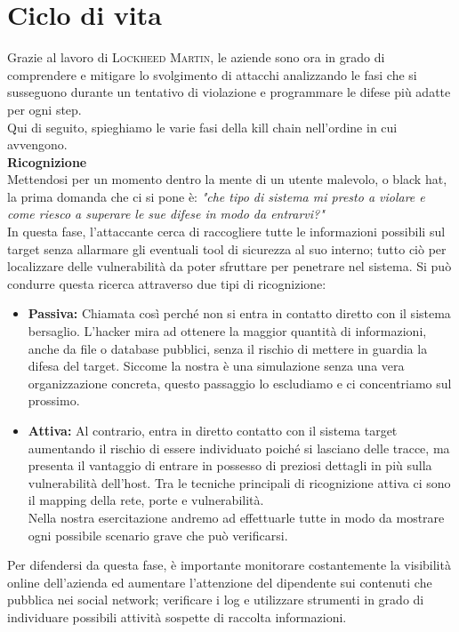 \section{Ciclo di vita}
Grazie al lavoro di \textsc{Lockheed Martin}, le aziende sono ora in grado di comprendere e mitigare lo svolgimento di attacchi analizzando le fasi che si susseguono durante un tentativo di violazione e programmare le difese più adatte per ogni step.\\
Qui di seguito, spieghiamo le varie fasi della kill chain nell'ordine in cui avvengono.\cite{kill_chain}\\[1.5em]
{\bfseries\Large{\textbf{Ricognizione}}}\\[1em]
Mettendosi per un momento dentro la mente di un utente malevolo, o black hat, la prima domanda che ci si pone è: \textit{"che tipo di sistema mi presto a violare e come riesco a superare le sue difese in modo da entrarvi?"}\\
In questa fase, l'attaccante cerca di raccogliere tutte le informazioni possibili sul target senza allarmare gli eventuali tool di sicurezza al suo interno; tutto ciò per localizzare delle vulnerabilità da poter sfruttare per penetrare nel sistema. Si può condurre questa ricerca attraverso due tipi di ricognizione:
\begin{itemize}
    \item \textbf{Passiva:} Chiamata così perché non si entra in contatto diretto con il sistema bersaglio. L'hacker mira ad ottenere la maggior quantità di informazioni, anche da file o database pubblici, senza il rischio di mettere in guardia la difesa del target. Siccome la nostra è una simulazione senza una vera organizzazione concreta, questo passaggio lo escludiamo e ci concentriamo sul prossimo.
    \item \textbf{Attiva:} Al contrario, entra in diretto contatto con il sistema target aumentando il rischio di essere individuato poiché si lasciano delle tracce, ma presenta il vantaggio di entrare in possesso di preziosi dettagli in più sulla vulnerabilità dell'host. Tra le tecniche principali di ricognizione attiva ci sono il mapping della rete, porte e vulnerabilità.\\Nella nostra esercitazione andremo ad effettuarle tutte in modo da mostrare ogni possibile scenario grave che può verificarsi.
\end{itemize}
Per difendersi da questa fase, è importante monitorare costantemente la visibilità online dell'azienda ed aumentare l'attenzione del dipendente sui contenuti che pubblica nei social network; verificare i log e utilizzare strumenti in grado di individuare possibili attività sospette di raccolta informazioni.\\

